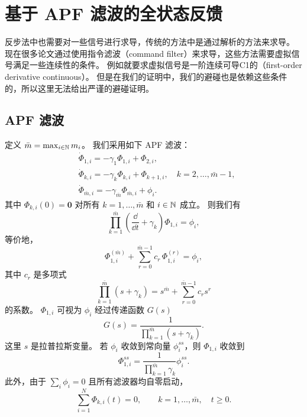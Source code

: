 \section{基于 APF 滤波的全状态反馈}

反步法中也需要对一些信号进行求导，传统的方法中是通过解析的方法来求导。
现在很多论文通过使用指令滤波（command filter）来求导，这些方法需要虚拟信号满足一些连续性的条件。
例如\cite{huPrescribedTimeAdaptiveTracking2026}就要求虚拟信号是一阶连续可导C1的（first-order derivative continuous）。
但是在我们的证明中，我们的避碰也是依赖这些条件的，所以这里无法给出严谨的避碰证明。

\subsection{APF 滤波}

定义 $\bar{m}=\max_{i\in\mathbb{N}} m_i$。
我们采用如下 APF 滤波：
\begin{align}
    &\dot{\Phi}_{1,i}=-\gamma_1 \Phi_{1,i} + \Phi_{2,i},\\
    &\dot{\Phi}_{k,i}=-\gamma_k \Phi_{k,i} + \Phi_{k+1,i},
      \quad k=2,\dots,\bar{m}-1,\\
    &\dot{\Phi}_{\bar{m},i}=-\gamma_{\bar{m}} \Phi_{\bar{m},i} + \phi_i.
\end{align}
其中 $\Phi_{k,i}(0)=\mathbf{0}$ 对所有 $k=1,\dots,\bar{m}$ 和 $i\in\mathbb{N}$ 成立。
则我们有
\begin{equation}
    \prod_{k=1}^{\bar{m}}\left(\frac{\dd}{\dd t}+\gamma_k\right)\Phi_{1,i}=\phi_i,
\end{equation}
等价地，
\begin{equation}
    \Phi_{1,i}^{(\bar{m})}+\sum_{r=0}^{\bar{m}-1} c_r\,\Phi_{1,i}^{(r)}=\phi_i,
\end{equation}
其中 $c_r$ 是多项式
\begin{equation}
    \prod_{k=1}^{\bar{m}} (s+\gamma_k)=s^{\bar{m}}+\sum_{r=0}^{\bar{m}-1} c_r s^r
\end{equation}
的系数。
$\Phi_{1,i}$ 可视为 $\phi_i$ 经过传递函数 $G(s)$
\begin{equation}
    G(s)=\frac{1}{\prod_{k=1}^{\bar{m}} (s+\gamma_k)}.
\end{equation}
这里 $s$ 是拉普拉斯变量。
若 $\phi_i$ 收敛到常向量 $\phi_i^{ss}$，则 $\Phi_{1,i}$ 收敛到
\begin{equation}
    \Phi_{1,i}^{ss}=\frac{1}{\prod_{k=1}^{\bar{m}} \gamma_k}\phi_i^{ss}.
\end{equation}
此外，由于 $\sum_i\phi_i=0$ 且所有滤波器均自零启动，
\begin{equation}
    \sum_{i=1}^N \Phi_{k,i}(t)=0,\qquad k=1,\dots,\bar m,\quad t\ge0.
\end{equation}


